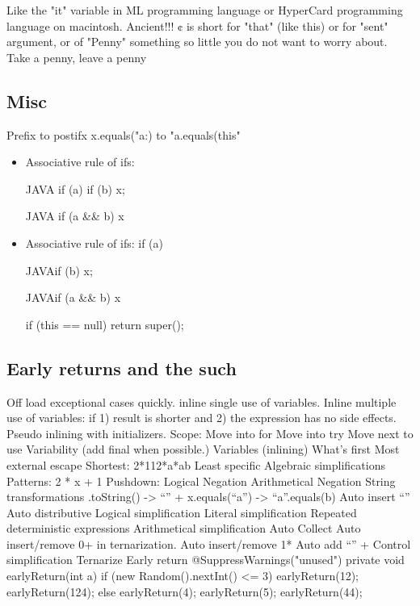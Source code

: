 Like the "it" variable in ML programming language or HyperCard programming language on macintosh. Ancient!!!
¢ is short for "that" (like this) or for "sent" argument, or of "Penny" something so little you do not want to worry about.
Take a penny, leave a penny

\subsection{Misc}
Prefix to postifx
x.equals("a:) to "a.equals(this"

\begin{itemize}
\item Associative rule of ifs: 
  \begin{code}{JAVA}
  if (a) if (b) x;
\end{code}
  \begin{code}{JAVA}
  if (a && b) x
  \end{code}
\item Associative rule of ifs: if (a) 
\begin{code}{JAVA}if (b) x;\end{code}
\begin{code}{JAVA}if (a && b) x\end{code}
\begin{java}
if (this == null) return super();
\end{java}
  
  \end{itemize}

\subsection{Early returns and the such}
Off load exceptional cases quickly.
inline single use of variables.
Inline multiple use of variables: if 1) result is shorter and 2) the expression has no side effects.
Pseudo inlining with initializers.
Scope:
Move into for
Move into try
Move next to use
Variability (add final when possible.)
Variables (inlining)
What’s first
Most external escape
Shortest: 2*112*a*ab
Least specific
Algebraic simplifications
Patterns: 2 * x + 1
Pushdown:
Logical Negation
Arithmetical Negation
String transformations
.toString() -> “” +
x.equals(“a”) -> “a”.equals(b)
Auto insert “”
Auto distributive
Logical simplification
Literal simplification
Repeated deterministic expressions
Arithmetical simplification
Auto Collect
Auto insert/remove 0+ in ternarization.
Auto insert/remove 1*
Auto add “” +
Control simplification
Ternarize
Early return
@SuppressWarnings("unused") private
void earlyReturn(int a) {
  if (new Random().nextInt() <= 3) {
    earlyReturn(12);
    earlyReturn(124);
    } else {
    earlyReturn(4);
    earlyReturn(5);
    earlyReturn(44);
  }
}

